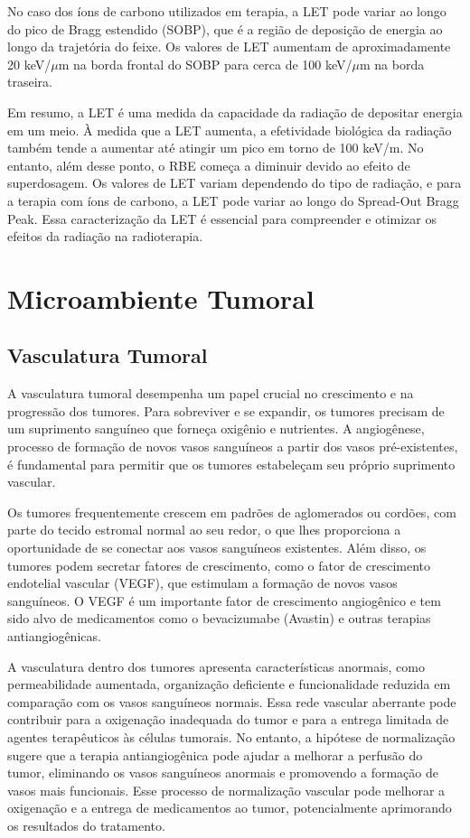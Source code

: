 \documentclass[11pt,a4paper]{article}
\begin{document}
	No caso dos íons de carbono utilizados em terapia, a LET pode variar ao longo do pico de Bragg estendido (SOBP), que é a região de deposição de energia ao longo da trajetória do feixe. Os valores de LET aumentam de aproximadamente 20 keV/$\mu$m na borda frontal do SOBP para cerca de 100 keV/$\mu$m na borda traseira.


	Em resumo, a LET é uma medida da capacidade da radiação de depositar energia em um meio. À medida que a LET aumenta, a efetividade biológica da radiação também tende a aumentar até atingir um pico em torno de 100 keV/\mu m. No entanto, além desse ponto, o RBE começa a diminuir devido ao efeito de superdosagem. Os valores de LET variam dependendo do tipo de radiação, e para a terapia com íons de carbono, a LET pode variar ao longo do Spread-Out Bragg Peak. Essa caracterização da LET é essencial para compreender e otimizar os efeitos da radiação na radioterapia.

\section{Microambiente Tumoral}

\subsection*{Vasculatura Tumoral}

	A vasculatura tumoral desempenha um papel crucial no crescimento e na progressão dos tumores. Para sobreviver e se expandir, os tumores precisam de um suprimento sanguíneo que forneça oxigênio e nutrientes. A angiogênese, processo de formação de novos vasos sanguíneos a partir dos vasos pré-existentes, é fundamental para permitir que os tumores estabeleçam seu próprio suprimento vascular.

	Os tumores frequentemente crescem em padrões de aglomerados ou cordões, com parte do tecido estromal normal ao seu redor, o que lhes proporciona a oportunidade de se conectar aos vasos sanguíneos existentes. Além disso, os tumores podem secretar fatores de crescimento, como o fator de crescimento endotelial vascular (VEGF), que estimulam a formação de novos vasos sanguíneos. O VEGF é um importante fator de crescimento angiogênico e tem sido alvo de medicamentos como o bevacizumabe (Avastin) e outras terapias antiangiogênicas.

	A vasculatura dentro dos tumores apresenta características anormais, como permeabilidade aumentada, organização deficiente e funcionalidade reduzida em comparação com os vasos sanguíneos normais. Essa rede vascular aberrante pode contribuir para a oxigenação inadequada do tumor e para a entrega limitada de agentes terapêuticos às células tumorais. No entanto, a hipótese de normalização sugere que a terapia antiangiogênica pode ajudar a melhorar a perfusão do tumor, eliminando os vasos sanguíneos anormais e promovendo a formação de vasos mais funcionais. Esse processo de normalização vascular pode melhorar a oxigenação e a entrega de medicamentos ao tumor, potencialmente aprimorando os resultados do tratamento.
\end{document}
